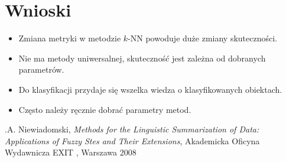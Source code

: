 \documentclass{classrep}
\begin{document}
\section{Wnioski}
{\color{blue} 
\begin{itemize}
 \item Zmiana metryki w metodzie $k$-NN powoduje duże zmiany skuteczności.
 \item Nie ma metody uniwersalnej, skuteczność jest zależna od dobranych parametrów.
 \item Do klasyfikacji przydaje się wszelka wiedza o klasyfikowanych obiektach.
 \item Często należy ręcznie dobrać parametry metod.
\end{itemize}
}

\begin{thebibliography}{0}
\bibitem .A. Niewiadomski, \textsl{Methods for the Linguistic Summarization of Data: Applications of Fuzzy Stes and Their Extensions}, Akademicka Oficyna Wydawnicza EXIT , Warszawa 2008
	
\end{thebibliography}
\end{document}
